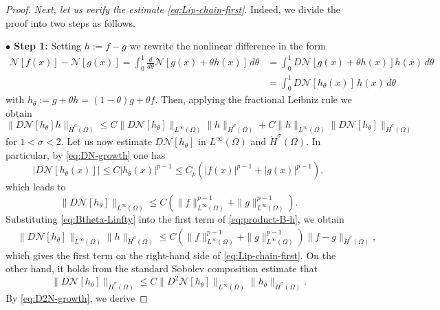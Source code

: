 \documentclass[a4paper,11pt]{article} %
\theoremstyle{remark}
\theoremstyle{definition}
\numberwithin{equation}{section}
\begin{document}
\begin{proof}
\textit{Next, let us verify the estimate \eqref{eq:Lip-chain-first}}. Indeed, we divide the proof into two steps as follows. \medskip

\noindent\textbf{$\bullet$ Step 1:} Setting $h:=f-g$ we rewrite the nonlinear difference in the form
\begin{align*}
\mathcal{N}[f(x)]-\mathcal{N}[g(x)]
=
\int_0^1
\frac{d}{d\theta}
\mathcal{N}[g(x)+\theta h(x)]
\,d\theta
&=
\int_0^1
D\mathcal{N}[g(x)+\theta h(x)]
h(x)\,d\theta \\
&= \int_0^1 D\mathcal{N}[h_\theta(x)]\, h(x)\,d\theta
\end{align*}
with $
h_\theta:=g+\theta h=(1-\theta)g+\theta f$. Then, applying the fractional Leibniz rule we obtain
\begin{equation}
\label{eq:product-B-h}
\big\|D\mathcal{N}[h_\theta] h\big\|_{\dot H^\sigma(\Omega)}
\le
C\big\|D\mathcal{N}[h_\theta]\big\|_{L^\infty(\Omega)}
\|h\|_{\dot H^\sigma(\Omega)}
+
C\|h\|_{L^\infty(\Omega)}
\big\|D\mathcal{N}[h_\theta]\big\|_{\dot H^\sigma(\Omega)}
\end{equation}
for \(1<\sigma<2\). Let us now estimate \(D\mathcal{N}[h_\theta]\) in \(L^\infty(\Omega)\) and \(\dot H^\sigma(\Omega)\). In particular, by \eqref{eq:DN-growth} one has
\[
\big|D\mathcal{N}[h_\theta(x)]\big|
\le
C|h_\theta(x)|^{p-1}
\le
C_p
\left(
|f(x)|^{p-1}+|g(x)|^{p-1}
\right),
\]
which leads to
\begin{equation}
\label{eq:Btheta-Linfty}
\big\|D\mathcal{N}[h_\theta]\big\|_{L^\infty(\Omega)}
\le
C
\left(
\|f\|_{L^\infty(\Omega)}^{p-1}
+
\|g\|_{L^\infty(\Omega)}^{p-1}
\right).
\end{equation}
Substituting \eqref{eq:Btheta-Linfty} into the first term of
\eqref{eq:product-B-h}, we obtain
\begin{align}
&\big\|D\mathcal{N}[h_\theta]\big\|_{L^\infty(\Omega)}
\|h\|_{\dot H^\sigma(\Omega)} \le
C
\left(
\|f\|_{L^\infty(\Omega)}^{p-1}
+
\|g\|_{L^\infty(\Omega)}^{p-1}
\right)
\|f-g\|_{\dot H^\sigma(\Omega)},
\label{eq:first-product-term}
\end{align}
which gives the first term on the right-hand side of
\eqref{eq:Lip-chain-first}. On the other hand, it holds from the standard Sobolev composition estimate that
\begin{equation}
\label{eq:composition-DN}
\big\|D\mathcal{N}[h_\theta]\big\|_{\dot H^\sigma(\Omega)}
\le
C
\big\|D^2\mathcal{N}[h_\theta]\big\|_{L^\infty(\Omega)}
\|h_\theta\|_{\dot H^\sigma(\Omega)}.
\end{equation}
By \eqref{eq:D2N-growth}, we derive

\end{proof}
\end{document}
